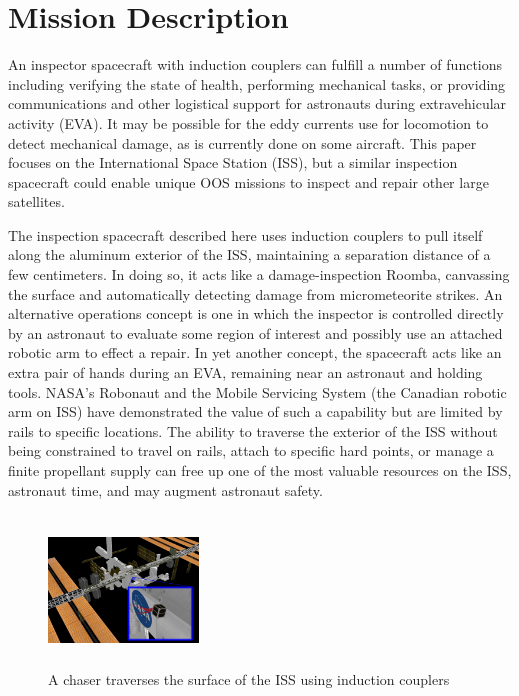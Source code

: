 \section{Mission Description}

An inspector spacecraft with induction couplers can fulfill a number of functions including verifying the state of health, performing mechanical tasks, or providing communications and other logistical support for astronauts during extravehicular activity (EVA). It may be possible for the eddy currents use for locomotion to detect mechanical damage, as is currently done on some aircraft. \cite{Yang2010}
 This paper focuses on the International Space Station (ISS), but a similar inspection spacecraft could enable unique OOS missions to inspect and repair other large satellites.

The inspection spacecraft described here uses induction couplers to pull itself along the aluminum exterior of the ISS, maintaining a separation distance of a few centimeters. In doing so, it acts like a damage-inspection Roomba,\cite{Tribelhorn2007}
 canvassing the surface and automatically detecting damage from micrometeorite strikes. An alternative operations concept is one in which the inspector is controlled directly by an astronaut to evaluate some region of interest and possibly use an attached robotic arm to effect a repair. In yet another concept, the spacecraft acts like an extra pair of hands during an EVA, remaining near an astronaut and holding tools. NASA's Robonaut and the Mobile Servicing System (the Canadian robotic arm on ISS) have demonstrated the value of such a capability but are limited by rails to specific locations. \cite{Ambrose2012}
The ability to traverse the exterior of the ISS without being constrained to travel on rails, attach to specific hard points, or manage a finite propellant supply can free up one of the most valuable resources on the ISS, astronaut time, and may augment astronaut safety.

\begin{figure}
\includegraphics[width = 4cm, height = 4cm ]{figures/iss_inspector.jpg}
\caption{A chaser traverses the surface of the ISS using induction couplers}
\label{fig:iss_inspector}
\end{figure}